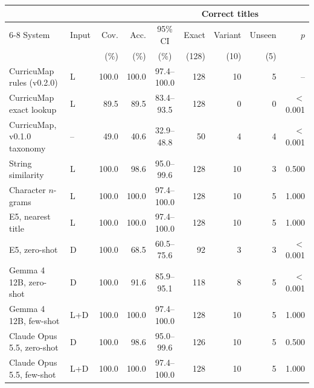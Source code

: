 \begin{tabular}{@{}llrrcrrrr@{}}
\toprule
 & & & & & \multicolumn{3}{c}{Correct titles} & \\ \cmidrule(lr){6-8}
System & Input & Cov. & Acc. & 95\% CI & Exact & Variant & Unseen & $p$ \\
 & & (\%) & (\%) & (\%) & (128) & (10) & (5) & \\
\midrule
CurricuMap rules (v0.2.0) & L & 100.0 & 100.0 & 97.4--100.0 & 128 & 10 & 5 & -- \\
CurricuMap exact lookup & L & 89.5 & 89.5 & 83.4--93.5 & 128 & 0 & 0 & $<$0.001 \\
CurricuMap, v0.1.0 taxonomy & -- & 49.0 & 40.6 & 32.9--48.8 & 50 & 4 & 4 & $<$0.001 \\
String similarity & L & 100.0 & 98.6 & 95.0--99.6 & 128 & 10 & 3 & 0.500 \\
Character $n$-grams & L & 100.0 & 100.0 & 97.4--100.0 & 128 & 10 & 5 & 1.000 \\
E5, nearest title & L & 100.0 & 100.0 & 97.4--100.0 & 128 & 10 & 5 & 1.000 \\
E5, zero-shot & D & 100.0 & 68.5 & 60.5--75.6 & 92 & 3 & 3 & $<$0.001 \\
Gemma 4 12B, zero-shot & D & 100.0 & 91.6 & 85.9--95.1 & 118 & 8 & 5 & $<$0.001 \\
Gemma 4 12B, few-shot & L+D & 100.0 & 100.0 & 97.4--100.0 & 128 & 10 & 5 & 1.000 \\
Claude Opus 5.5, zero-shot & D & 100.0 & 98.6 & 95.0--99.6 & 126 & 10 & 5 & 0.500 \\
Claude Opus 5.5, few-shot & L+D & 100.0 & 100.0 & 97.4--100.0 & 128 & 10 & 5 & 1.000 \\
\bottomrule
\end{tabular}
